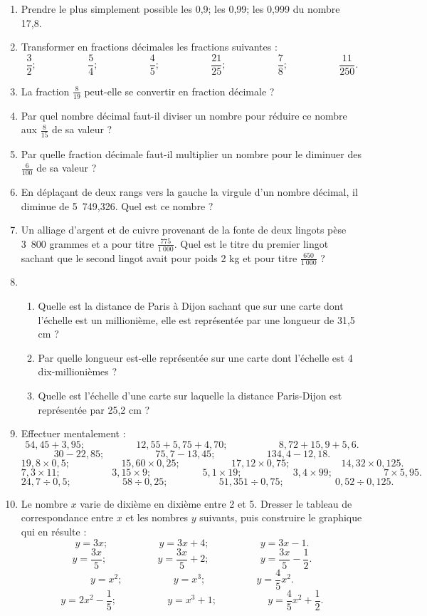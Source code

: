 \begin{enumerate}
 \item Prendre le plus simplement possible les 0,9; les 0,99; les 0,999 du nombre 17,8. 
 \item Transformer en fractions décimales les fractions suivantes : 
 \[\frac32; \phantom{meowmeow}
 \frac54; \phantom{meowmeow}
 \frac45; \phantom{meowmeow}
 \frac{21}{25};\phantom{meowmeow}
 \frac78; \phantom{meowmeow}
 \frac{11}{250}.\]
 \item La fraction $\frac8{19}$ peut-elle se convertir en fraction décimale ?
 \item Par quel nombre décimal faut-il diviser un nombre pour réduire ce 
 nombre aux $\frac8{15}$ de sa valeur ? 
 \item Par quelle fraction décimale faut-il multiplier un nombre pour 
 le diminuer des $\frac6{100}$ de sa valeur ? 
 \item En déplaçant de deux rangs vers la gauche la virgule d'un nombre décimal, il diminue de 5~749,326. Quel est ce nombre ? 
 \item Un alliage d'argent et de cuivre provenant de la fonte de deux lingots
 pèse 3~800 grammes et a pour titre $\frac{775}{1~000}$. Quel est le titre du 
 premier lingot sachant que le second lingot avait pour poids 2 kg et pour titre $\frac{650}{1~000}$ ? 
 \item 
 \begin{enumerate}
 \item Quelle est la distance de Paris à Dijon sachant que sur une carte dont 
 l'échelle est un millionième, elle est représentée par une longueur de 31,5 cm ? 
 \item Par quelle longueur est-elle représentée sur une carte dont l'échelle est 4 dix-millionièmes ? 
 \item Quelle est l'échelle d'une carte sur laquelle la distance Paris-Dijon est représentée par 25,2 cm ? \end{enumerate}
 \item Effectuer mentalement : 
 \[ 54,45+ 3,95 ; \phantom{meowmeow} 12,55 + 5,75+ 4,70 ; \phantom{meowmeow} 
 8,72 + 15,9 + 5,6.\]
 \[ 30 - 22,85 ; \phantom{meowmeow} 75,7 - 13,45 ;\phantom{meowmeow} 134,4 - 12,18.\]
 \[ 19,8 \times 0,5 ; \phantom{meowmeow} 15,60\times 0,25 ; \phantom{meowmeow} 17,12 \times 0,75 ; \phantom{meowmeow} 14,32\times 0,125.\]
 \[ 7,3 \times 11; \phantom{meowmeow}3,15 \times 9 ; 
 \phantom{meowmeow} 5,1 \times 19 ; \phantom{meowmeow}
 3,4 \times 99 ; \phantom{meowmeow} 7 \times 5,95.\]
 \[ 24,7 \div 0,5 ; \phantom{meowmeow} 58 \div 0,25 ; \phantom{meowmeow}
 51,351\div 0,75; \phantom{meowmeow} 0,52 \div 0,125.\]
 \item Le nombre $x$ varie de dixième en dixième entre 2 et 5. Dresser le tableau de correspondance entre $x$ et les nombres $y$ suivants, puis construire le graphique qui en résulte : 
 \[ y = 3x; \phantom{meowmeow} y = 3x+4; \phantom{meowmeow} y=3x-1.\]
 \[ y = \frac{3x}5; \phantom{meowmeow}y = \frac{3x}5 + 2; \phantom{meowmeow}
 y = \frac{3x}5 - \frac12.\]
 \[ y = x^2; \phantom{meowmeow} y = x^3; \phantom{meowmeow} y = \frac45x^2.\]
 \[ y = 2x^2 - \frac15; \phantom{meowmeow} 
 y = x^3 + 1; \phantom{meowmeow} y = \frac45 x^2 + \frac12.\]
 
 \end{enumerate}